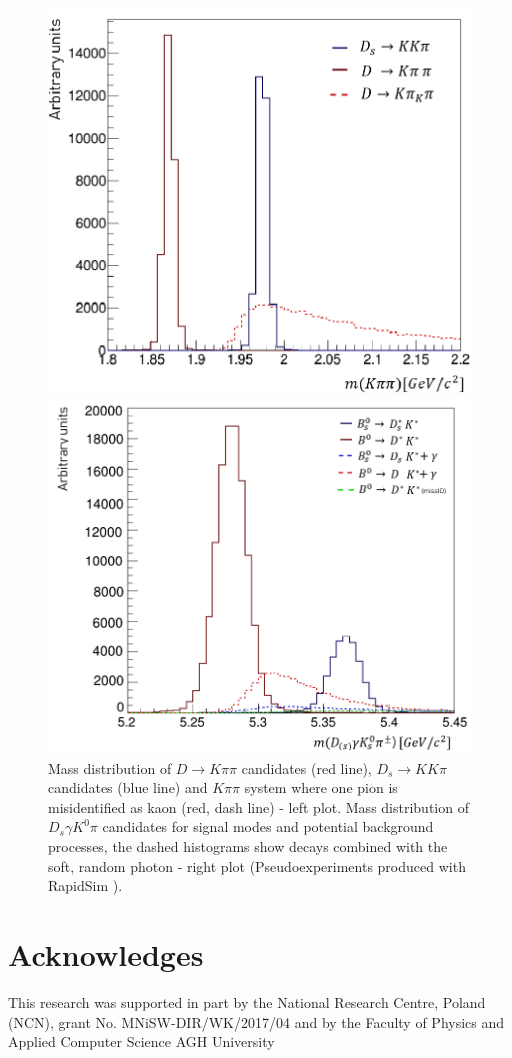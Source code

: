 \documentclass{appolb}
\begin{document}
\begin{figure}[h!]
\begin{minipage}{0.5\textwidth}
  \centering
\includegraphics[width=6.2 cm]{D3.png}
\end{minipage}%
\begin{minipage}{0.5\textwidth}
  \centering
\includegraphics[width= 6.7 cm]{B_new.png}
\end{minipage}%
\caption{Mass distribution of $D \to K \pi \pi$ candidates (red line), $D_s \to K K \pi$ candidates (blue line) and $K\pi\pi$ system where one pion is misidentified as kaon (red, dash line) - left plot.
Mass distribution of $D_s \gamma K^0 \pi$ candidates for signal modes and potential background processes, the dashed histograms show decays combined with the soft, random photon - right plot (Pseudoexperiments produced with RapidSim \cite{rapidsim}).}
\label{Fig:F3}
\end{figure}

\section{Acknowledges}
This research was supported in part by the National Research Centre, Poland
(NCN), grant No. MNiSW-DIR/WK/2017/04 and by the Faculty of Physics and Applied Computer Science AGH University
\end{document}
